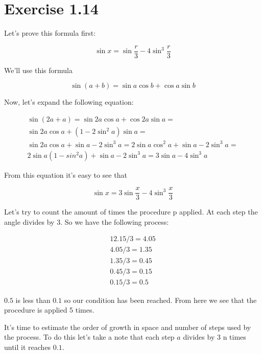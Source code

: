\section{Exercise 1.14}

Let's prove this formula first:

\begin{equation}
	\sin x = \sin \frac {r} {3} - 4 \sin^3 \frac {r} {3}
\end{equation}

We'll use this formula

\begin{equation}
	\sin (a+b) = \sin a \cos b + \cos a \sin b
\end{equation}

Now, let's expand the following equation:

\begin{gather}
	\sin(2a+a) = \sin 2a \cos a + \cos 2a \sin a = \\
	\sin 2a \cos a + \left(1 - 2 \sin^2 a\right) \sin a = \\
	\sin 2a \cos a + \sin a - 2 \sin^3 a = 
	2 \sin a \cos^2 a + \sin a - 2 \sin^3 a = \\
	2 \sin a \left(1 - sin^2 a\right) + \sin a - 2 \sin^3 a = 
	3 \sin a - 4 \sin^3 a
\end{gather}

From this equation it's easy to see that

\begin{equation}
	\sin x = 3 \sin \frac {x} {3} - 4 \sin^3 \frac {x} {3}
\end{equation}

Let's try to count the amount of times the procedure p applied. At each step the angle divides by 3. So we have the following process:

\[
\begin{aligned}
	12.15 / 3 = 4.05 \\
	4.05 / 3 = 1.35 \\
	1.35 / 3 = 0.45 \\
	0.45 / 3 = 0.15 \\
	0.15 / 3 = 0.5
\end{aligned}
\]

$0.5$ is less than $0.1$ so our condition has been reached. From here we see that the procedure is applied 5 times.

It's time to estimate the order of growth in space and number of steps used by the process. To do this let's take a note that each step $a$ divides by $3$ n times until it reaches $0.1$.

